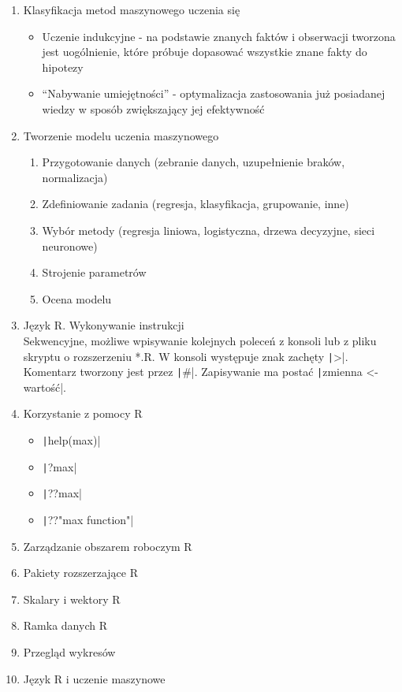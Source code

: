 \documentclass[11pt]{article}
\begin{document}
\begin{enumerate}
\begin{itemize}
        \end{itemize}
        \item Klasyfikacja metod maszynowego uczenia się
        \begin{itemize}
            \item Uczenie indukcyjne - na podstawie znanych faktów i obserwacji tworzona
            jest uogólnienie, które próbuje dopasować wszystkie znane fakty do hipotezy
            \item ``Nabywanie umiejętności'' - optymalizacja zastosowania już posiadanej
            wiedzy w sposób zwiększający jej efektywność
        \end{itemize}
        \item Tworzenie modelu uczenia maszynowego
        \begin{enumerate}
            \item Przygotowanie danych (zebranie danych, uzupełnienie braków, normalizacja)
            \item Zdefiniowanie zadania (regresja, klasyfikacja, grupowanie, inne)
            \item Wybór metody (regresja liniowa, logistyczna, drzewa decyzyjne,
            sieci neuronowe)
            \item Strojenie parametrów
            \item Ocena modelu
        \end{enumerate}
        \item Język R. Wykonywanie instrukcji\\
        Sekwencyjne, możliwe wpisywanie kolejnych poleceń z konsoli lub z pliku skryptu
        o rozszerzeniu *.R.
        W konsoli występuje znak zachęty \texttt|>|.
        Komentarz tworzony jest przez \texttt|#|.
        Zapisywanie ma postać \texttt|zmienna <- wartość|.
        \item Korzystanie z pomocy R
        \begin{itemize}
        	\item \texttt|help(max)|
        	\item \texttt|?max|
        	\item \texttt|??max|
        	\item \texttt|??"max function"|
        \end{itemize}
        \item Zarządzanie obszarem roboczym R
        \item Pakiety rozszerzające R
        \item Skalary i wektory R
        \item Ramka danych R
        \item Przegląd wykresów
        \item Język R i uczenie maszynowe
    \end{enumerate}
    
\end{document}
